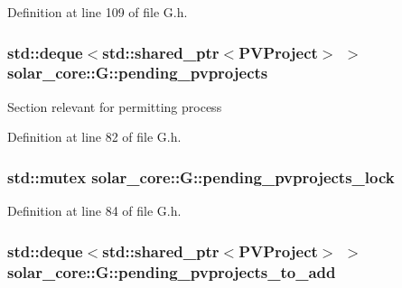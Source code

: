 Definition at line 109 of file G.\+h.

\hypertarget{classsolar__core_1_1_g_a3a87f9e5c14cd5bae4be8a4da538181e}{}
\subsubsection[{pending\+\_\+pvprojects}]{\setlength{\rightskip}{0pt plus 5cm}std\+::deque$<$std\+::shared\+\_\+ptr$<${\bf P\+V\+Project}$>$ $>$ solar\+\_\+core\+::\+G\+::pending\+\_\+pvprojects\hspace{0.3cm}{\ttfamily [protected]}}\label{classsolar__core_1_1_g_a3a87f9e5c14cd5bae4be8a4da538181e}
Section relevant for permitting process 

Definition at line 82 of file G.\+h.

\hypertarget{classsolar__core_1_1_g_a7ae124e062dbd50b0da66f34c9633965}{}
\subsubsection[{pending\+\_\+pvprojects\+\_\+lock}]{\setlength{\rightskip}{0pt plus 5cm}std\+::mutex solar\+\_\+core\+::\+G\+::pending\+\_\+pvprojects\+\_\+lock\hspace{0.3cm}{\ttfamily [protected]}}\label{classsolar__core_1_1_g_a7ae124e062dbd50b0da66f34c9633965}


Definition at line 84 of file G.\+h.

\hypertarget{classsolar__core_1_1_g_a053a3d2c00c5af66925ebe359c4b4228}{}
\subsubsection[{pending\+\_\+pvprojects\+\_\+to\+\_\+add}]{\setlength{\rightskip}{0pt plus 5cm}std\+::deque$<$std\+::shared\+\_\+ptr$<${\bf P\+V\+Project}$>$ $>$ solar\+\_\+core\+::\+G\+::pending\+\_\+pvprojects\+\_\+to\+\_\+add\hspace{0.3cm}{\ttfamily [protected]}}\label{classsolar__core_1_1_g_a053a3d2c00c5af66925ebe359c4b4228}


